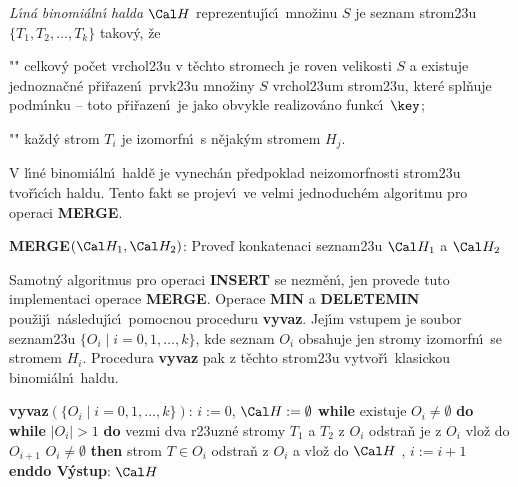 \documentclass[a4paper,12pt]{article}
\begin{document}
\flushpar\emph{L\'\i n\'a} \emph{binomi\'aln\'\i} \emph{halda} $\Cal H$ 
reprezentuj\'\i c\'\i\ mno\v zinu $S$ je seznam strom\accent23u 
$\{T_1,T_2,\dots,T_k\}$ takov\'y, \v ze  
\roster
\item"{}"
celkov\'y po\v cet vrchol\accent23u v t\v echto stromech je 
roven velikosti $S$ a 
existuje jednozna\v cn\'e p\v ri\v razen\'\i\ prvk\accent23u mno\v ziny 
$S$ vrchol\accent23um strom\accent23u, kter\'e spl\v nuje 
podm\'\i nku  -- toto p\v ri\v razen\'\i\ je jako obvykle 
realizov\'ano funkc\'\i\ $\key$;
\item"{}"
ka\v zd\'y strom $T_i$ je izomorfn\'\i\ s n\v ejak\'ym stromem $H_
j$.
\endroster
\medskip

\flushpar V l\'\i n\'e binomi\'aln\'\i\ hald\v e je vynech\'an p\v redpoklad 
neizo\-morf\-nosti strom\accent23u tvo\v r\'\i c\'\i ch haldu. Tento fakt se 
projev\'\i\ ve velmi jednoduch\'em algoritmu pro operaci 
{\bf MERGE}.
\bigskip

{\bf MERGE$(\Cal H_1,\Cal H_2)$}:\newline 
Prove\v d konkatenaci seznam\accent23u $\Cal H_1$ a $\Cal H_2$
\bigskip

\flushpar Samotn\'y algoritmus pro operaci {\bf INSERT} se nezm\v en\'\i , jen 
provede tuto implementaci ope\-race {\bf MER\-GE}.  Ope\-race 
{\bf MIN} a {\bf DELETE\-MIN} pou\v zij\'\i\ n\'asleduj\'\i c\'\i\ pomocnou 
proceduru {\bf vyvaz}.  Jej\'\i m vstu\-pem je soubor 
seznam\accent23u $\{O_i\mid i=0,1,\dots,k\}$, kde seznam $O_i$ 
obsahuje jen stromy izomorfn\'\i\ se stromem $H_i$.  
Procedura {\bf vyvaz} pak z t\v echto strom\accent23u vytvo\v r\'\i\ 
klasickou binomi\'aln\'\i\ hal\-du. 
\bigskip

{\bf vyvaz$(\{O_i\mid i=0,1,\dots,k\})$}:\newline 
$i:=0$, $\Cal H:=\emptyset$\newline 
{\bf while} existuje $O_i\ne\emptyset$ {\bf do\newline 
\phantom{{\rm ---}}while} $|O_i|>1$ {\bf do\newline 
\phantom{{\rm ------}}}vezmi dva r\accent23uzn\'e stromy $T_1$ a $
T_2$ z 
$O_i$\newline 
\phantom{------}odstra\v n je z $O_i$\newline 
\phantom{------}{\bf spoj$(T_1,T_2)$} vlo\v z do $O_{i+1}$\newline 
{} $O_i\ne\emptyset$ {\bf then\newline 
\phantom{{\rm ------}}}strom $T\in O_i$ odstra\v n z $O_i$ a vlo\v z do $
\Cal H$\newline 
\phantom{---}{\bf endif},\newline 
\phantom{---}$i:=i+1$\newline 
{\bf enddo\newline 
V\'ystup}: $\Cal H$
\bigskip
\end{document}
